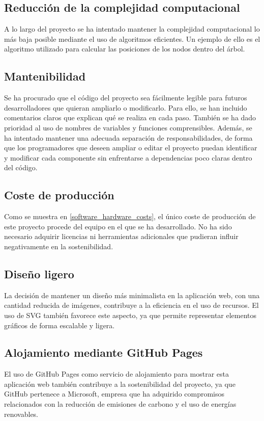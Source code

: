 \subsection{Reducción de la complejidad computacional}
A lo largo del proyecto se ha intentado mantener la complejidad computacional lo más baja posible mediante el uso de algoritmos eficientes. Un ejemplo de ello es el algoritmo utilizado para calcular las posiciones de los nodos dentro del árbol.

\subsection{Mantenibilidad}
Se ha procurado que el código del proyecto sea fácilmente legible para futuros desarrolladores que quieran ampliarlo o modificarlo. Para ello, se han incluido comentarios claros que explican qué se realiza en cada paso. También se ha dado prioridad al uso de nombres de variables y funciones comprensibles. Además, se ha intentado mantener una adecuada separación de responsabilidades, de forma que los programadores que deseen ampliar o editar el proyecto puedan identificar y modificar cada componente sin enfrentarse a dependencias poco claras dentro del código.

\subsection{Coste de producción}
Como se muestra en \ref{software_hardware_costs}, el único coste de producción de este proyecto procede del equipo en el que se ha desarrollado. No ha sido necesario adquirir licencias ni herramientas adicionales que pudieran influir negativamente en la sostenibilidad.

\subsection{Diseño ligero}
La decisión de mantener un diseño más minimalista en la aplicación web, con una cantidad reducida de imágenes, contribuye a la eficiencia en el uso de recursos. El uso de SVG también favorece este aspecto, ya que permite representar elementos gráficos de forma escalable y ligera.

\subsection{Alojamiento mediante GitHub Pages}
El uso de GitHub Pages como servicio de alojamiento para mostrar esta aplicación web también contribuye a la sostenibilidad del proyecto, ya que GitHub pertenece a Microsoft, empresa que ha adquirido compromisos relacionados con la reducción de emisiones de carbono y el uso de energías renovables.

